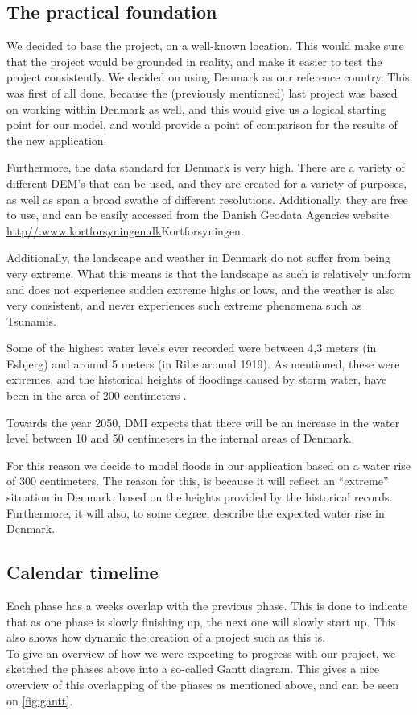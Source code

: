 \subsection{The practical foundation}
We decided to base the project, on a well-known location. This would make sure that the project would be grounded in reality, and make it easier to test the project consistently.
We decided on using Denmark as our reference country. This was first of all done, because the (previously mentioned) last project was based on working within Denmark as well, and this would give us a logical starting point for our model, and would provide a point of comparison for the results of the new application. 

Furthermore, the data standard for Denmark is very high. There are a variety of different DEM's that can be used, and they are created for a variety of purposes, as well as span a broad swathe of different resolutions. Additionally, they are free to use, and can be easily accessed from the Danish Geodata Agencies website \url{http//:www.kortforsyningen.dk}{Kortforsyningen}. 

Additionally, the landscape and weather in Denmark do not suffer from being very extreme. What this means is that the landscape as such is relatively uniform and does not experience sudden extreme highs or lows, and  the weather is also very consistent, and never experiences such extreme phenomena such as Tsunamis. 

Some of the highest water levels ever recorded were between 4,3 meters (in Esbjerg) and around 5 meters (in Ribe around 1919). As mentioned, these were extremes, and the historical heights of floodings caused by storm water, have been in the area of 200 centimeters \citep{kyst}.

Towards the year 2050, DMI expects that there will be an increase in the water level between 10 and 50 centimeters in the internal areas of Denmark. \citep{dmi}

For this reason we decide to model floods in our application based on a water rise of 300 centimeters. The reason for this, is because it will reflect an “extreme” situation in Denmark, based on the heights provided by the historical records. Furthermore, it will also, to some degree, describe the expected water rise in Denmark.

\subsection{Calendar timeline}
Each phase has a weeks overlap with the previous phase. This is done to indicate that as one phase is slowly finishing up, the next one will slowly start up. This also shows how dynamic the creation of a project such as this is. \\
To give an overview of how we were expecting to progress with our project, we sketched the phases above into a so-called Gantt diagram. This gives a nice overview of this overlapping of the phases as mentioned above, and can be seen on \autoref{fig:gantt}.

